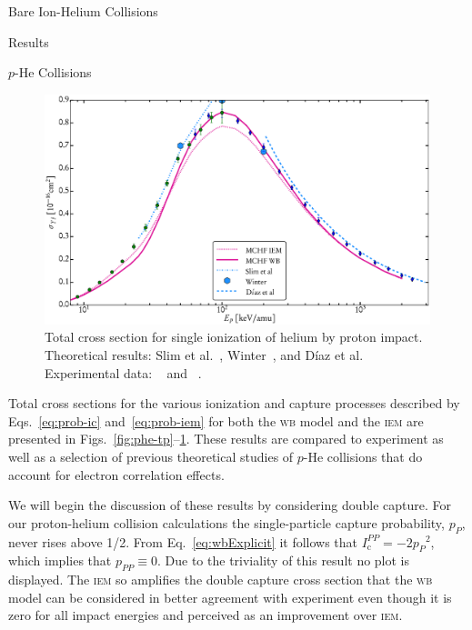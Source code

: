 \documentclass[a5paper, 9 pt]{extreport}
\begin{document}
\begin{chapter}{Bare Ion-Helium Collisions \label{chap:p-he2p-he}}
\begin{section}{Results \label{sec:phe2p-res}}
\begin{subsection}{\texorpdfstring{$p$}{p}-He Collisions \label{sec:phe-res}}
         \begin{figure}[t]
            \centering
            \includegraphics[width = 0.95 \linewidth]{./images/phe/phe-TI.eps}
            \caption[Total cross section for single ionization of helium by proton impact.]
                    {Total cross section for single ionization of helium by proton impact.
                     Theoretical results: Slim et al.~\cite{SHBF-91},
                     Winter~\cite{Winter-91}, and D\'{i}az et al.~\cite{DMS-00}
                     Experimental data: {\color{OliveGreen}{$\bullet$}}~\cite{SG89} and
                     {\color{blue}{$\blacklozenge$}}~\cite{SG85}. \label{fig:phe-ti}}
         \end{figure}

         Total cross sections for the various ionization and capture processes described by
         Eqs.~\eqref{eq:prob-ic} and~\eqref{eq:prob-iem} for both the \textsc{wb} model and the
         \textsc{iem} are presented in Figs.~\ref{fig:phe-tp}--\ref{fig:phe-ti}. These results are
         compared to experiment as well as a selection of previous theoretical studies of $p$-He
         collisions that do account for electron correlation effects.

         We will begin the discussion of these results by considering double capture. For our
         proton-helium collision calculations the single-particle capture probability, $p_P$, never
         rises above 1/2. From Eq.~\eqref{eq:wbExplicit} it follows that $I^{PP}_\mathrm{c} =
         -2 {p_P}^2$, which implies that $p_{PP} \equiv 0$. Due to the triviality of this result no plot
         is displayed. The \textsc{iem} so amplifies the double capture cross section that the
         \textsc{wb} model can be considered in better agreement with experiment even though it is zero
         for all impact energies and perceived as an improvement over \textsc{iem}.


\end{subsection}
\end{section}
\end{chapter}
\end{document}
